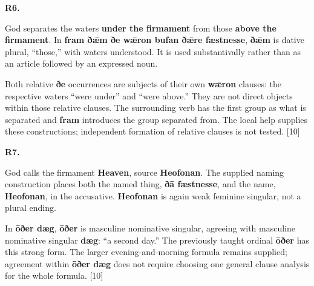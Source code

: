 \par\begin{minipage}{\linewidth}\raggedright
\textbf{R6.}

God separates the waters \textbf{under the firmament} from those \textbf{above the firmament}. In \textbf{fram ðǣm ðe wǣron bufan ðǣre fæstnesse}, \textbf{ðǣm} is dative plural, “those,” with waters understood. It is used substantivally rather than as an article followed by an expressed noun.

Both relative \textbf{ðe} occurrences are subjects of their own \textbf{wǣron} clauses: the respective waters “were under” and “were above.” They are not direct objects within those relative clauses. The surrounding verb has the first group as what is separated and \textbf{fram} introduces the group separated from. The local help supplies these constructions; independent formation of relative clauses is not tested. [10]

\end{minipage}\par\addvspace{4pt}

\par\begin{minipage}{\linewidth}\raggedright
\textbf{R7.}

God calls the firmament \textbf{Heaven}, source \textbf{Heofonan}. The supplied naming construction places both the named thing, \textbf{ðā fæstnesse}, and the name, \textbf{Heofonan}, in the accusative. \textbf{Heofonan} is again weak feminine singular, not a plural ending.

In \textbf{ōðer dæg}, \textbf{ōðer} is masculine nominative singular, agreeing with masculine nominative singular \textbf{dæg}: “a second day.” The previously taught ordinal \textbf{ōðer} has this strong form. The larger evening-and-morning formula remains supplied; agreement within \textbf{ōðer dæg} does not require choosing one general clause analysis for the whole formula. [10]

\end{minipage}\par\addvspace{4pt}

